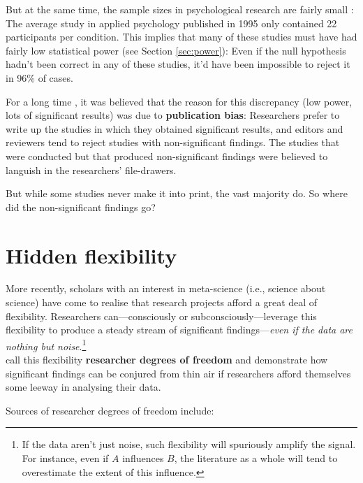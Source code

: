\documentclass[a4paper]{tufte-book}\usepackage[]{graphicx}\usepackage[]{xcolor}
\newcommand{\term}[1]{\textbf{#1}}
\begin{document}
But at the same time, the sample sizes in psychological research
are fairly small \citep{Marszalek2011,Sedlmeier1989}: The average
study in applied psychology published in 1995 only contained 
22 participants per condition. This implies that many of these studies
must have had fairly low statistical power (see Section \vref{sec:power}): 
Even if the null hypothesis hadn't been correct in any of these studies,
it'd have been impossible to reject it in 96\% of cases.

For a long time \citep[see already][]{Sterling1959}, it was believed
that the reason for this discrepancy (low power, lots of significant
results) was due to \term{publication bias}: 
Researchers prefer to write up the studies in which they obtained
significant results, and editors and reviewers tend to reject
studies with non-significant findings. The studies that were conducted
but that produced non-significant findings were believed to languish
in the researchers' file-drawers.

But while some studies never make it into print, the vast majority do.
So where did the non-significant findings go?

\section{Hidden flexibility}

More recently, scholars with an interest in meta-science (i.e.,
science about science) have come to realise that research projects
afford a great deal of flexibility. Researchers can---consciously
or subconsciously---leverage this flexibility to produce a steady stream
of significant findings---\emph{even if the data are nothing but noise}.\footnote{If the data aren't just noise, such flexibility will spuriously amplify the signal. For instance, even if $A$ influences $B$, the literature as a whole will tend to overestimate the extent of this influence.}\\
\citet{Simmons2011} call this flexibility \term{researcher degrees of freedom} 
and demonstrate how significant findings can be 
conjured from thin air if researchers afford themselves some leeway in
analysing their data.

Sources of researcher degrees of freedom include:
\end{document}
